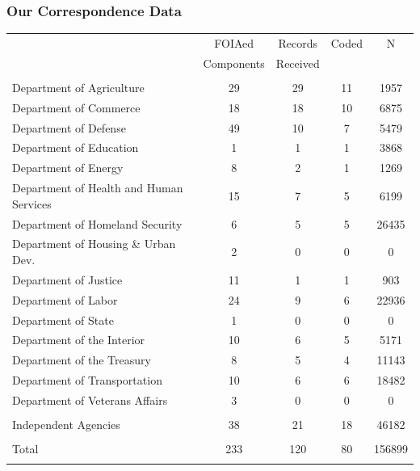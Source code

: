 \documentclass[13pt]{beamer}
\begin{document}
\begin{frame}
\frametitle{Our Correspondence Data}
\scriptsize
\begin{table}[!htbp] \centering 
  \label{} 
\begin{tabular}{@{\extracolsep{5pt}} lcccc} 
 & FOIAed  & Records & Coded & N \\ 
 &Components&Received&&\\
\hline \\[-1.8ex] 
Department of Agriculture & 29 & 29 & 11 & 1957 \\ 
Department of Commerce & 18 & 18 & 10 & 6875 \\ 
Department of Defense & 49 & 10 & 7 & 5479 \\ 
Department of Education & 1 & 1 & 1 & 3868 \\ 
Department of Energy & 8 & 2 & 1 & 1269 \\ 
Department of Health and Human Services & 15 & 7 & 5 & 6199 \\ 
Department of Homeland Security & 6 & 5 & 5 & 26435 \\ 
Department of Housing \& Urban Dev. & 2 & 0 & 0 & 0 \\ 
Department of Justice & 11 & 1 & 1 & 903 \\ 
Department of Labor & 24 & 9 & 6 & 22936 \\ 
Department of State & 1 & 0 & 0 & 0 \\ 
Department of the Interior & 10 & 6 & 5 & 5171 \\ 
Department of the Treasury & 8 & 5 & 4 & 11143 \\ 
Department of Transportation & 10 & 6 & 6 & 18482 \\ 
Department of Veterans Affairs & 3 & 0 & 0 & 0 \\ 
\hline \\[-1.8ex] 
Independent Agencies & 38 & 21 & 18 & 46182 \\ 
\hline \\[-1.8ex] 
Total & 233 & 120 & 80 & 156899 \\ 
\hline \\[-1.8ex] 
\end{tabular} 
\end{table} 

\end{frame}
\end{document}
